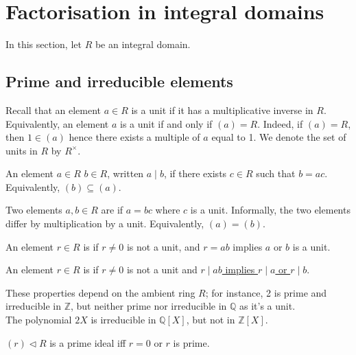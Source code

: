 \section{Factorisation in integral domains}

In this section, let $R$ be an integral domain.

\subsection{Prime and irreducible elements}
Recall that an element $a \in R$ is a unit if it has a multiplicative inverse in $R$.
Equivalently, an element $a$ is a unit if and only if $(a) = R$.
Indeed, if $(a) = R$, then $1 \in (a)$ hence there exists a multiple of $a$ equal to 1.
We denote the set of units in $R$ by $R^\times$.

\begin{definition}[Divides]
	An element $a \in R$  $b \in R$, written $a \mid b$, if there exists $c \in R$ such that $b = ac$.
	Equivalently, $(b) \subseteq (a)$.
\end{definition}

\begin{definition}[Associates]
	Two elements $a, b \in R$ are  if $a = bc$ where $c$ is a unit.
	Informally, the two elements differ by multiplication by a unit.
	Equivalently, $(a) = (b)$.
\end{definition} 

\begin{definition}
	An element $r \in R$ is  if $r \neq 0$ is not a unit, and $r = ab$ implies $a$ or $b$ is a unit.
\end{definition}

\begin{definition}[Prime]
	An element $r \in R$ is  if $r \neq 0$ is not a unit and \underline{$r \mid ab$ implies $r \mid a$ or $r \mid b$}.
\end{definition} 

\begin{remark}
	These properties depend on the ambient ring $R$; for instance, 2 is prime and irreducible in $\mathbb Z$, but neither prime nor irreducible in $\mathbb Q$ as it's a unit. \\
	The polynomial $2X$ is irreducible in $\mathbb Q[X]$, but not in $\mathbb Z[X]$.
\end{remark}

\begin{lemma} \label{lem:10.1}
	$(r) \triangleleft R$ is a prime ideal iff $r = 0$ or $r$ is prime.
\end{lemma}

